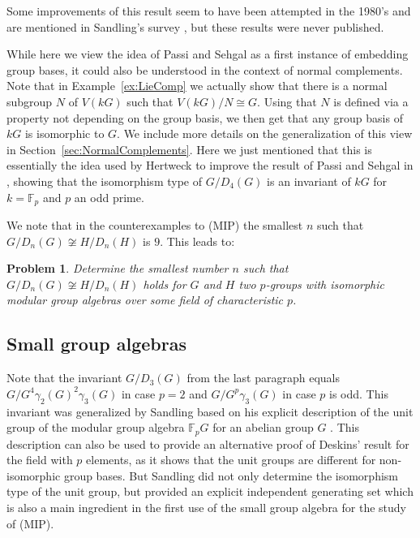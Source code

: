 \documentclass[11pt, a4paper]{amsart}
\newtheorem{problem}[theorem]{Problem}
\theoremstyle{definition}
\begin{document}
Some improvements of this result seem to have been attempted in the 1980's and are mentioned in Sandling's survey \cite[6.22 Theorem]{SandlingSurvey}, but these results were never published.

While here we view the idea of Passi and Sehgal as a first instance of embedding group bases, it could also be understood in the context of normal complements. Note that in Example~\ref{ex:LieComp} we actually show that there is a normal subgroup $N$ of $V(kG)$ such that $V(kG)/N \cong G$. Using that $N$ is defined via a property not depending on the group basis, we then get that any group basis of $kG$ is isomorphic to $G$. We include more details on the generalization of this view in Section~\ref{sec:NormalComplements}. Here we just mentioned that this is essentially the idea used by Hertweck to improve the result of Passi and Sehgal in \cite{Hertweck07}, showing that the isomorphism type of $G/D_4(G)$ is an invariant of $kG$ for $k = \mathbb{F}_p$ and $p$ an odd prime. 

We note that in the counterexamples to (MIP) the smallest $n$ such that $G/D_n(G) \not\cong H/D_n(H)$ is $9$. This leads to:

\begin{problem}
Determine the smallest number $n$ such that $G/D_n(G) \not\cong H/D_n(H)$ holds for $G$ and $H$ two $p$-groups with isomorphic modular group algebras over some field of characteristic $p$. 
\end{problem}

\subsection{Small group algebras}\label{sec:SmallGroupAlgebras}

Note that the invariant $G/D_3(G)$ from the last paragraph equals $G/G^4\gamma_2(G)^2\gamma_3(G)$ in case $p = 2$ and $G/G^p\gamma_3(G)$ in case $p$ is odd. This invariant was generalized by Sandling based on his explicit description of the unit group of the modular group algebra $\mathbb{F}_pG$ for an abelian group $G$ \cite{Sandling84}. This description can also be used to provide an alternative proof of Deskins' result for the field with $p$ elements, as it shows that the unit groups are different for non-isomorphic group bases. But Sandling did not only determine the isomorphism type of the unit group, but provided an explicit independent generating set which is also a main ingredient in the first use of the small group algebra for the study of (MIP).
\end{document}
